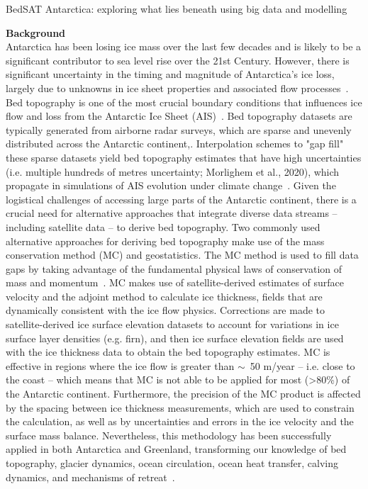 \documentclass[10pt,a4paper]{article}
\begin{document}
\begin{center}
    {\Large BedSAT Antarctica: exploring what lies beneath using big data and modelling}\\ [1cm]
\end{center}
{\textbf{Background}}\\
Antarctica has been losing ice mass over the last few decades and is likely to be a significant contributor to sea level rise over the 21st Century. However, there is significant uncertainty in the timing and magnitude of Antarctica's ice loss, largely due to unknowns in ice sheet properties and associated flow processes~\cite{IPCC}. Bed topography is one of the most crucial boundary conditions that influences ice flow and loss from the Antarctic Ice Sheet (AIS)~\cite{DeepGlacialTroughs}. Bed topography datasets are typically generated from airborne radar surveys, which are sparse and unevenly distributed across the Antarctic continent,. Interpolation schemes to "gap fill" these sparse datasets yield bed topography estimates that have high uncertainties (i.e. multiple hundreds of metres uncertainty; Morlighem et al., 2020), which propagate in simulations of AIS evolution under climate change~\cite{ReductionOfUncertaintyThwaites}. Given the logistical challenges of accessing large parts of the Antarctic continent, there is a crucial need for alternative approaches that integrate diverse data streams – including satellite data – to derive bed topography.
Two commonly used alternative approaches for deriving bed topography make use of the mass conservation method (MC) and geostatistics. The MC method is used to fill data gaps by taking advantage of the fundamental physical laws of conservation of mass and momentum~\cite{DeepGlacialTroughs}. MC makes use of satellite-derived estimates of surface velocity and the adjoint method to calculate ice thickness, fields that are dynamically consistent with the ice flow physics. Corrections are made to satellite-derived ice surface elevation datasets to account for variations in ice surface layer densities (e.g. firn), and then ice surface elevation fields are used with the ice thickness data to obtain the bed topography estimates. MC is effective in regions where the ice flow is greater than $\sim$~50 m/year -- i.e. close to the coast -- which means that MC is not able to be applied for most (>80\%) of the Antarctic continent. Furthermore, the precision of the MC product is affected by the spacing between ice thickness measurements, which are used to constrain the calculation, as well as by uncertainties and errors in the ice velocity and the surface mass balance. Nevertheless, this methodology has been successfully applied in both Antarctica and Greenland, transforming our knowledge of bed topography, glacier dynamics, ocean circulation, ocean heat transfer, calving dynamics, and mechanisms of retreat~\cite{DeepGlacialTroughs, BedMachinev3}.
\end{document}
